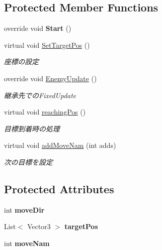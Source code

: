 \subsection*{Protected Member Functions}
\begin{DoxyCompactItemize}
\item 
\mbox{\label{class_target_move_a3fb71017e9d1e1a29b9dabf02a8d9462}} 
override void {\bfseries Start} ()
\item 
virtual void \hyperlink{class_target_move_a72a50d04fd830edcb8ae5d3b63c3cc36}{Set\+Target\+Pos} ()
\begin{DoxyCompactList}\small\item\em 座標の設定 \end{DoxyCompactList}\item 
override void \hyperlink{class_target_move_a4e86c888ec0ad3b43c30a6ff17a0411d}{Enemy\+Update} ()
\begin{DoxyCompactList}\small\item\em 継承先での\+Fixed\+Update \end{DoxyCompactList}\item 
virtual void \hyperlink{class_target_move_aaac3d0086f68958d440f2131559894f2}{reaching\+Pos} ()
\begin{DoxyCompactList}\small\item\em 目標到着時の処理 \end{DoxyCompactList}\item 
virtual void \hyperlink{class_target_move_ace85a95cffab1a4ce3f782c9be95248c}{add\+Move\+Nam} (int adds)
\begin{DoxyCompactList}\small\item\em 次の目標を設定 \end{DoxyCompactList}\end{DoxyCompactItemize}
\subsection*{Protected Attributes}
\begin{DoxyCompactItemize}
\item 
\mbox{\label{class_target_move_afdc525f68ab7c07b06fe2228cdcd749f}} 
int {\bfseries move\+Dir}
\item 
\mbox{\label{class_target_move_a73bcf7a28a6195630e05f4525a8b7b58}} 
List$<$ Vector3 $>$ {\bfseries target\+Pos}
\item 
\mbox{\label{class_target_move_ab2fd18fdf3955c89421c66253d161f54}} 
int {\bfseries move\+Nam}
\end{DoxyCompactItemize}

